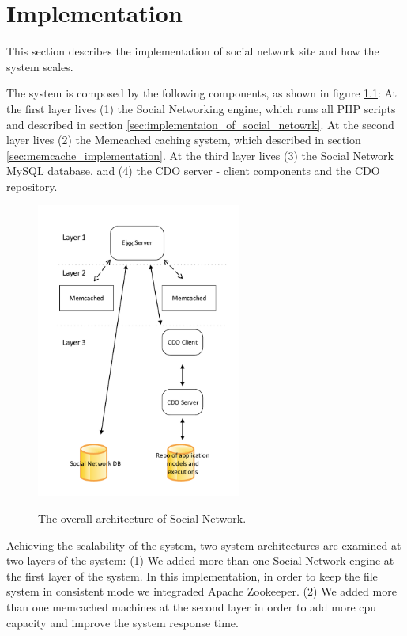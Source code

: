 
\chapter{Implementation}

This section describes the implementation of social network site
and how the system scales.

The system is composed by the following components, as shown in figure \ref{fig:system_architecture}: At the first layer lives (1) the Social Networking engine, which runs all PHP scripts and described in section \ref{sec:implementaion_of_social_netowrk}. At the second layer lives (2) the Memcached caching system, which described in section \ref{sec:memcache_implementation}. At the third layer lives (3) the Social Network MySQL database, and (4) the CDO server - client components and the CDO repository.

\begin{figure}[h]
	\caption{The overall architecture of Social Network.}
	\includegraphics[width=0.6\textwidth,natwidth=200,natheight=150]{./fig/system_architecture.pdf}
	\centering
	\label{fig:system_architecture}
\end{figure}

Achieving the scalability of the system, two system architectures are examined at two layers of the system: (1) We added more than one Social Network engine at the first layer of the system. In this implementation, in order to keep the file system in consistent mode we integraded Apache Zookeeper\cite{zookeeper_url}. (2) We added more than one memcached machines at the second layer in order to add more cpu capacity and improve the system response time.

